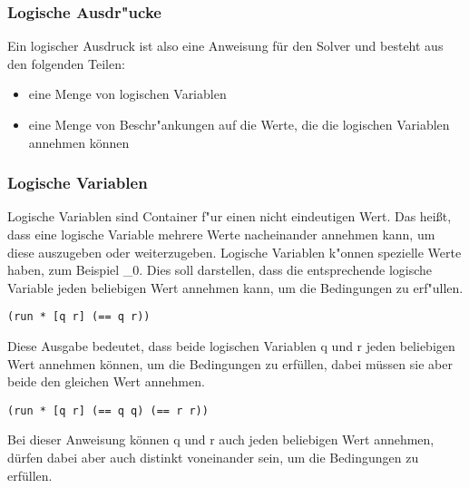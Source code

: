 
\subsubsection{Logische Ausdr"ucke}

Ein logischer Ausdruck ist also eine Anweisung für den Solver und besteht aus den folgenden Teilen:
\begin{itemize}

\item eine Menge von logischen Variablen

\item eine Menge von Beschr"ankungen auf die Werte, die die logischen Variablen annehmen können

\end{itemize}


\subsubsection{Logische Variablen}
Logische Variablen sind Container f"ur einen nicht eindeutigen Wert. Das hei\ss{}t, dass eine logische Variable mehrere Werte nacheinander annehmen kann, um diese auszugeben oder weiterzugeben.
Logische Variablen k"onnen spezielle Werte haben, zum Beispiel \_0. Dies soll darstellen, dass die entsprechende logische Variable jeden beliebigen Wert annehmen kann, um die Bedingungen zu erf"ullen.

\begin{lstlisting}
(run * [q r] (== q r))
\end{lstlisting}
\begin{flushleft}
\end{flushleft}
Diese Ausgabe bedeutet, dass beide logischen Variablen q und r jeden beliebigen Wert annehmen können, um die Bedingungen zu erfüllen, dabei müssen sie aber beide den gleichen Wert annehmen.

\begin{lstlisting}
(run * [q r] (== q q) (== r r))
\end{lstlisting}
\begin{flushleft}
\end{flushleft}
Bei dieser Anweisung können q und r auch jeden beliebigen Wert annehmen, dürfen dabei aber auch distinkt voneinander sein, um die Bedingungen zu erfüllen.\\


